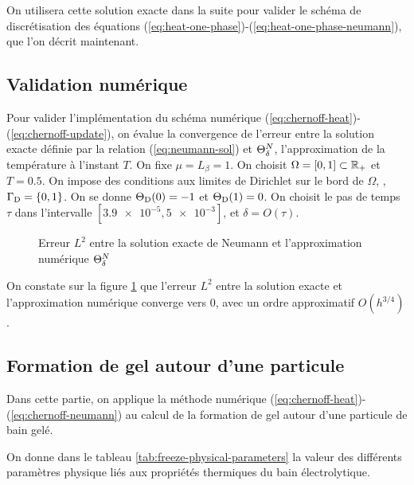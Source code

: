 On utilisera cette solution exacte dans la suite pour valider le schéma de
discrétisation des équations
(\ref{eq:heat-one-phase})-(\ref{eq:heat-one-phase-neumann}), que l'on
décrit maintenant.

\subsection*{Validation numérique}
Pour valider l'implémentation du schéma numérique
(\ref{eq:chernoff-heat})-(\ref{eq:chernoff-update}), on évalue la
convergence de l'erreur entre la solution exacte définie par la
relation (\ref{eq:neumann-sol}) et $\Theta^N_\delta$,
l'approximation de la température à l'instant $T$. On fixe $\mu =
L_\beta = 1$. On choisit $\Omega = [0, 1] \subset \mathbb R_+$ et $T =
0.5$. On impose des conditions aux limites de Dirichlet sur le bord de
$\Omega$, \ie, $\Gamma_\mathrm{D} = \left\{ 0, 1 \right\}$. On se donne
$\Theta_\mathrm{D}(0) = -1$ et $\Theta_\mathrm{D}(1) =
0$. On choisit le pas de temps $\tau$ dans l'intervalle
$[\num{3.9e-5}, \num{5e-3}]$, et $\delta = O(\tau)$.

\begin{figure}
  \begin{center}
    
    \caption{Erreur $L^2$ entre la solution exacte de Neumann et
      l'approximation numérique $\Theta^N_\delta$}
    \label{fig:neumann-convergence}
  \end{center}
\end{figure}

On constate sur la figure \ref{fig:neumann-convergence} que l'erreur
$L^2$ entre la solution exacte et l'approximation numérique converge
vers 0, avec un ordre approximatif $O(h^{3/4})$.




\subsection*{Formation de gel autour d'une particule}
Dans cette partie, on applique la méthode numérique
(\ref{eq:chernoff-heat})-(\ref{eq:chernoff-neumann}) au calcul de
la formation de gel autour d'une particule de bain gelé.

On donne dans le tableau \ref{tab:freeze-physical-parameters} la
valeur des différents paramètres physique liés aux propriétés
thermiques du bain électrolytique.

